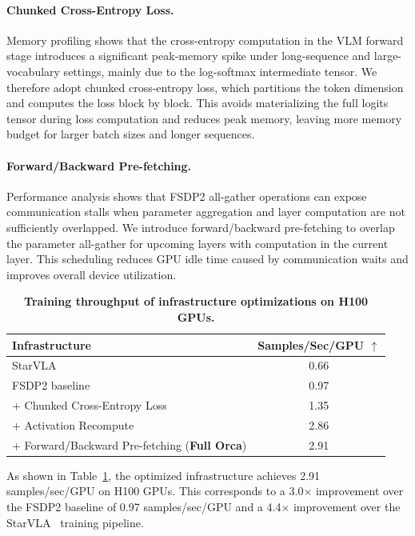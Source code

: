 \documentclass{llmxive}
\begin{document}
\paragraph{Chunked Cross-Entropy Loss.} 
Memory profiling shows that the cross-entropy computation in the VLM forward stage introduces a significant peak-memory spike under long-sequence and large-vocabulary settings, mainly due to the log-softmax intermediate tensor. We therefore adopt chunked cross-entropy loss, which partitions the token dimension and computes the loss block by block. This avoids materializing the full logits tensor during loss computation and reduces peak memory, leaving more memory budget for larger batch sizes and longer sequences.


\paragraph{Forward/Backward Pre-fetching.} 
Performance analysis shows that FSDP2 all-gather operations can expose communication stalls when parameter aggregation and layer computation are not sufficiently overlapped. We introduce forward/backward pre-fetching to overlap the parameter all-gather for upcoming layers with computation in the current layer. This scheduling reduces GPU idle time caused by communication waits and improves overall device utilization.


\begin{table}[!htbp]
    \centering
    \begin{tabular}{lc}
    \toprule[1pt]
    \textbf{Infrastructure} & \textbf{Samples/Sec/GPU $\uparrow$} \\
    \midrule[0.5pt]
    StarVLA~\citep{StarVLA} & 0.66 \\
    FSDP2 baseline & 0.97 \\
    \midrule[0.5pt]
    + Chunked Cross-Entropy Loss & 1.35 \\
    + Activation Recompute & 2.86 \\
    + Forward/Backward Pre-fetching (\textbf{Full Orca}) & 2.91 \\
    \bottomrule[1pt]
    \end{tabular}
\caption{\textbf{Training throughput of infrastructure optimizations on H100 GPUs.}}
\label{tab:appendix_infra_comparison}
\end{table}

As shown in Table~\ref{tab:appendix_infra_comparison}, the optimized infrastructure achieves 2.91 samples/sec/GPU on H100 GPUs. This corresponds to a 3.0$\times$ improvement over the FSDP2 baseline of 0.97 samples/sec/GPU and a 4.4$\times$ improvement over the StarVLA~\citep{StarVLA} training pipeline.
\end{document}

